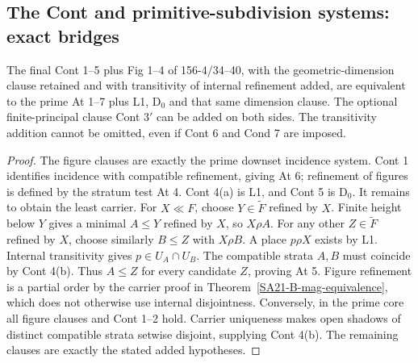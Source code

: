 \subsection{The Cont and primitive-subdivision systems: exact bridges}

\begin{proposition}
\label{SA21-B-Cont-bridge}
The final Cont 1--5 plus Fig 1--4 of 156-4/34--40, with the
geometric-dimension clause retained and with transitivity of internal
refinement added, are equivalent to the prime At 1--7 plus L1,
D\(_0\) and that same dimension clause. The optional finite-principal
clause Cont \(3'\) can be added on both sides. The transitivity
addition cannot be omitted, even if Cont 6 and Cond 7 are imposed.
\end{proposition}

\begin{proof}
The figure clauses are exactly the prime downset incidence system.
Cont 1 identifies incidence with compatible refinement, giving
At 6; refinement of figures is defined by the stratum test At 4.
Cont 4(a) is L1, and Cont 5 is D\(_0\).
It remains to obtain the least carrier. For \(X\ll F\), choose
\(Y\in\widetilde F\) refined by \(X\). Finite height below \(Y\)
gives a minimal \(A\leq Y\) refined by \(X\), so \(X\rho A\).
For any other \(Z\in\widetilde F\) refined by \(X\), choose
similarly \(B\leq Z\) with \(X\rho B\). A place \(p\rho X\)
exists by L1. Internal transitivity gives \(p\in U_A\cap U_B\).
The compatible strata \(A,B\) must coincide by Cont 4(b).
Thus \(A\leq Z\) for every candidate \(Z\), proving At 5.
Figure refinement is a partial order by the carrier proof in
Theorem~\ref{SA21-B-mag-equivalence}, which does not otherwise use
internal disjointness. Conversely, in the prime core all figure
clauses and Cont 1--2 hold. Carrier uniqueness makes open shadows
of distinct compatible strata setwise disjoint, supplying Cont 4(b).
The remaining clauses are exactly the stated added hypotheses.
\end{proof}

